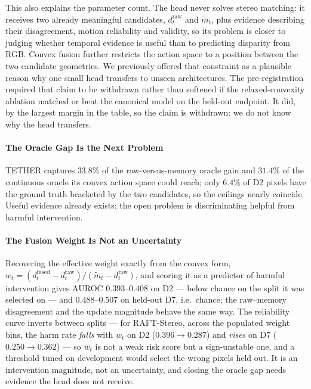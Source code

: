 \documentclass[letterpaper,10pt,conference]{ieeeconf}
\newcommand{\raw}{\mathrm{raw}}
\newcommand{\fused}{\mathrm{fused}}
\begin{document}
This also explains the parameter count. The head never solves stereo
matching: it receives two already meaningful candidates, $d_t^{\raw}$ and
$\widetilde m_t$, plus evidence describing their disagreement, motion
reliability and validity, so its problem is closer to judging whether
temporal evidence is useful than to predicting disparity from RGB. Convex
fusion further restricts the action space to a position between the two
candidate geometries. We previously offered that constraint as a plausible
reason why one small head transfers to unseen architectures. The
pre-registration required that claim to be withdrawn rather than softened if
the relaxed-convexity ablation matched or beat the canonical model on the
held-out endpoint. It did, by the largest margin in the table, so the claim is
withdrawn: we do not know why the head transfers.

\paragraph{The Oracle Gap Is the Next Problem}

TETHER captures $33.8\%$ of the raw-versus-memory oracle gain and
$31.4\%$ of the continuous oracle its convex action space could reach;
only $6.4\%$ of D2 pixels have the ground truth bracketed by the two
candidates, so the ceilings nearly coincide. Useful evidence already
exists; the open problem is discriminating helpful from harmful
intervention.

\paragraph{The Fusion Weight Is Not an Uncertainty}

Recovering the effective weight exactly from the convex form,
$w_t=(d_t^{\fused}-d_t^{\raw})/(\widetilde m_t-d_t^{\raw})$, and scoring
it as a predictor of harmful intervention gives AUROC $0.393$--$0.408$ on
D2 --- below chance on the split it was selected on --- and
$0.488$--$0.507$ on held-out D7, i.e.\ chance; the raw--memory
disagreement and the update magnitude behave the same way. The
reliability curve inverts between splits --- for RAFT-Stereo, across the
populated weight bins, the harm rate \emph{falls} with $w_t$ on D2
($0.396\rightarrow0.287$) and \emph{rises} on D7
($0.250\rightarrow0.362$) --- so $w_t$ is not a weak risk score but a
sign-unstable one, and a threshold tuned on development would select the
wrong pixels held out. It is an intervention magnitude, not an uncertainty,
and closing the oracle gap needs evidence the head does not receive.
\end{document}
